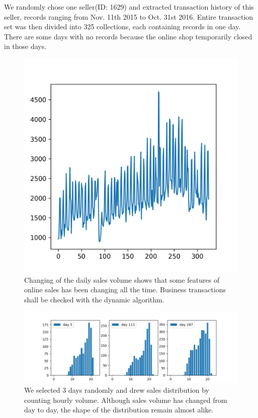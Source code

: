 \documentclass[10pt,conference,letterpaper]{IEEEtran}
\begin{document}
			We randomly chose one seller(ID: 1629) and extracted transaction history of this seller, records ranging from Nov. 11th 2015 to Oct. 31st 2016. Entire transaction set was then divided into 325 collections, each containing records in one day. There are some days with no records because the online shop temporarily closed in those days.
	
			\begin{figure}[!ht]
				\centering
				\includegraphics[width=0.75\linewidth]{fig/DailyTransactionVolume.png}
				\caption{Changing of the daily sales volume shows that some features of online sales has been changing all the time. Business transactions shall be checked with the dynamic algorithm.}
				\label{fig:daily-transaction-volume}
			\end{figure}
	
			\begin{figure}[ht]
				\centering
				\includegraphics[width=\linewidth]{fig/SaleDistributionSamples.png}
				\caption{We selected 3 days randomly and drew sales distribution by counting hourly volume. Although sales volume has changed from day to day, the shape of the distribution remain almost alike.}
				\label{fig:sale-distribution-sample}
			\end{figure}
	
\end{document}

